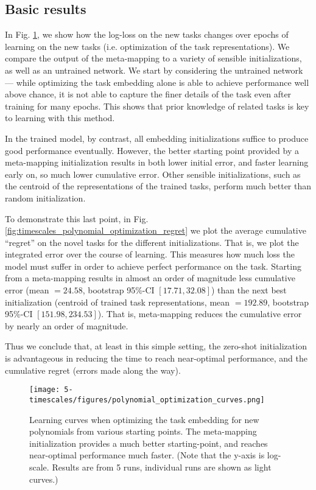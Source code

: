 \subsection{Basic results}
In Fig. \ref{fig:timescales_polynomial_optimization_curves}, we show how the log-loss on the new tasks changes over epochs of learning on the new tasks (i.e. optimization of the task representations). We compare the output of the meta-mapping to a variety of sensible initializations, as well as an untrained network. We start by considering the untrained network --- while optimizing the task embedding alone is able to achieve performance well above chance, it is not able to capture the finer details of the task even after training for many epochs. This shows that prior knowledge of related tasks is key to learning with this method. \par
In the trained model, by contrast, all embedding initializations suffice to produce good performance eventually. However, the better starting point provided by a meta-mapping initialization results in both lower initial error, and faster learning early on, so much lower cumulative error. Other sensible initializations, such as the centroid of the representations of the trained tasks, perform much better than random initialization.\par
To demonstrate this last point, in Fig. \ref{fig:timescales_polynomial_optimization_regret} we plot the average cumulative ``regret'' on the novel tasks for the different initializations. That is, we plot the integrated error over the course of learning. This measures how much loss the model must suffer in order to achieve perfect performance on the task. Starting from a meta-mapping results in almost an order of magnitude less cumulative error (mean \(= 24.58\), bootstrap 95\%-CI \([17.71, 32.08]\)) than the next best initialization (centroid of trained task representations, mean \(= 192.89\), bootstrap 95\%-CI \([151.98, 234.53]\)). That is, meta-mapping reduces the cumulative error by nearly an order of magnitude. \par
Thus we conclude that, at least in this simple setting, the zero-shot initialization is advantageous in reducing the time to reach near-optimal performance, and the cumulative regret (errors made along the way). \par 
\begin{figure}[p]
\centering
\texttt{[image: 5-timescales/figures/polynomial\_optimization\_curves.png]}
\caption[Learning curves when optimizing the task embedding for new polynomials from various starting points.]{Learning curves when optimizing the task embedding for new polynomials from various starting points. The meta-mapping initialization provides a much better starting-point, and reaches near-optimal performance much faster. (Note that the y-axis is log-scale. Results are from 5 runs, individual runs are shown as light curves.)} \label{fig:timescales_polynomial_optimization_curves}
\end{figure}

